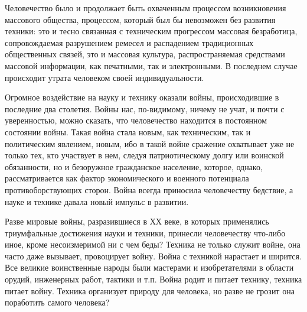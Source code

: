 Человечество было и продолжает быть охваченным процессом возникновения массового общества, процессом, который был бы невозможен без развития техники: это и тесно связанная с техническим прогрессом массовая безработица, сопровождаемая разрушением ремесел и распадением традиционных общественных связей, это и массовая культура, распространяемая средствами массовой информации, как печатными, так и электронными. В последнем случае происходит утрата человеком своей индивидуальности.

Огромное воздействие на науку и технику оказали войны, происходившие в последние два столетия. Войны нас, по-видимому, ничему не учат, и почти с уверенностью, можно сказать, что человечество находится в постоянном состоянии войны. Такая война стала новым, как техническим, так и политическим явлением, новым, ибо в такой войне сражение охватывает уже не только тех, кто участвует в нем, следуя патриотическому долгу или воинской обязанности, но и безоружное гражданское население, которое, однако, рассматривается как фактор экономического и военного потенциала противоборствующих сторон. Война всегда приносила человечеству бедствие, а науке и технике давала новый импульс в развитии.

Разве мировые войны, разразившиеся в ХХ веке, в которых применялись триумфальные достижения науки и техники, принесли человечеству что-либо иное, кроме несоизмеримой ни с чем беды? Техника не только служит войне, она часто даже вызывает, провоцирует войну. Война с техникой нарастает и ширится. Все великие воинственные народы были мастерами и изобретателями в области орудий, инженерных работ, тактики и т.п. Война родит и питает технику, техника питает войну. Техника организует природу для человека, но разве не грозит она поработить самого человека?

